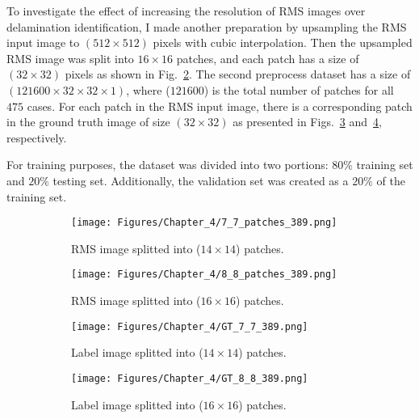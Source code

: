 To investigate the effect of increasing the resolution of RMS images over delamination identification, I made another preparation by upsampling the RMS input image to \((512\times 512)\) pixels with cubic interpolation. Then the upsampled RMS image was split into \(16\times 16\) patches, and each patch has a size of \((32\times 32)\) pixels as shown in Fig.~\ref{fig:RMS_64patches}.
The second preprocess dataset has a size of \((121600 \times 32 \times 32 \times 1)\), where (\(121600\)) is the total number of patches for all \(475\) cases.
For each patch in the RMS input image, there is a corresponding patch in the ground truth image of size \((32\times 32)\) as presented in Figs.~\ref{fig:GT_49patches} and~\ref{fig:GT_64patches}, respectively.

For training purposes, the dataset was divided into two portions: \(80\%\)	training set and \(20\%\) testing set. 
Additionally, the validation set was created as a \(20\%\) of the training set.
\begin{figure} [h!]
	\centering
	\begin{subfigure}[b]{0.47\textwidth}
		\centering
		\texttt{[image: Figures/Chapter\_4/7\_7\_patches\_389.png]}
		\caption{RMS image splitted into (\(14\times 14\)) patches.}
		\label{fig:RMS_49patches}
	\end{subfigure}
	\hfill
	\begin{subfigure}[b]{0.47\textwidth}
		\centering
		\texttt{[image: Figures/Chapter\_4/8\_8\_patches\_389.png]}
		\caption{RMS image splitted into (\(16\times 16\)) patches.}
		\label{fig:RMS_64patches}
	\end{subfigure}
	\hfill
	\begin{subfigure}[b]{0.47\textwidth}
		\centering
		\texttt{[image: Figures/Chapter\_4/GT\_7\_7\_389.png]}
		\caption{Label image splitted into (\(14\times 14\)) patches.}
		\label{fig:GT_49patches}
	\end{subfigure}
	\hfill
	\begin{subfigure}[b]{0.47\textwidth}
		\centering
		\texttt{[image: Figures/Chapter\_4/GT\_8\_8\_389.png]}
		\caption{Label image splitted into (\(16\times 16\)) patches.}
		\label{fig:GT_64patches}
	\end{subfigure}
	\caption{}
	\label{fig:grid_mesh}
\end{figure}

